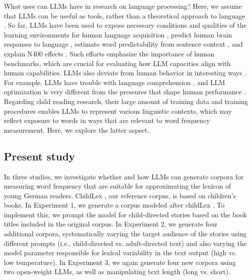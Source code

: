 \documentclass[doc, a4paper, anonymous]{apa7}
\begin{document}

What uses can LLMs have in research on language processing? Here, we assume that LLMs can be useful as tools, rather than a theoretical approach to language \citep[e.g., as in][]{binz2024centaur}. So far, LLMs have been used to expose necessary conditions and qualities of the learning environments for human language acquisition \citep{warstadt_findings_2023, trott_large_2023}, predict human brain responses to language \citep{tuckute_driving_2024}, estimate word predictability from sentence context \citep{hofmann_language_2022, chandra_synthetic_2023, heilbron_prediction_2021}, and explain N400 effects \citep{michaelov_strong_2024}. Such efforts emphasize the importance of human benchmarks, which are crucial for evaluating how LLM capacities align with human capabilities. LLMs also deviate from human behavior in interesting ways \citep{mahowald_dissociating_2024}. For example, LLMs have trouble with language comprehension \citep{Dentella_2024}, and LLM optimization is very different from the pressures that shape human performance \citep{mccoy_embers_2023}. Regarding child reading research, their large amount of training data and training procedures enables LLMs to represent various linguistic contexts, which may reflect exposure to words in ways that are relevant to word frequency measurement. Here, we explore the latter aspect. 

\subsection*{Present study}

In three studies, we investigate whether and how LLMs can generate corpora for measuring word frequency that are suitable for approximating the lexicon of young German readers. ChildLex \citep{schroeder_childlex_2015}, our reference corpus, is based on children's books. In Experiment 1, we generate a corpus modeled after childLex \citep{schroeder_childlex_2015}. To implement this, we prompt the model for child-directed stories based on the book titles included in the original corpus. In Experiment 2, we generate four additional corpora, systematically varying the target audience of the stories using different prompts (i.e., child-directed vs. adult-directed text) and also varying the model parameter responsible for lexical variability in the text output (high vs. low temperature). In Experiment 3, we again generate four new corpora using two open-weight LLMs, as well as manipulating text length (long vs. short). 
\end{document}
